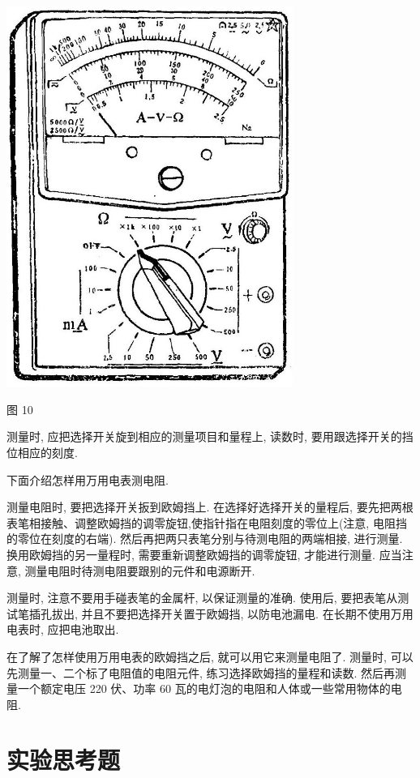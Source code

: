 \documentclass[10pt]{article}
\begin{document}
\begin{center}
\includegraphics[max width=0.7\textwidth]{images/01913056-1f15-74d8-9184-9aab52c9d66b_381_422104.jpg}
\end{center}

图 10

测量时, 应把选择开关旋到相应的测量项目和量程上, 读数时, 要用跟选择开关的挡位相应的刻度.

下面介绍怎样用万用电表测电阻.

测量电阻时, 要把选择开关扳到欧姆挡上. 在选择好选择开关的量程后, 要先把两根表笔相接触、调整欧姆挡的调零旋钮,使指针指在电阻刻度的零位上(注意, 电阻挡的零位在刻度的右端). 然后再把两只表笔分别与待测电阻的两端相接, 进行测量. 换用欧姆挡的另一量程时, 需要重新调整欧姆挡的调零旋钮, 才能进行测量. 应当注意, 测量电阻时待测电阻要跟别的元件和电源断开.

测量时, 注意不要用手碰表笔的金属杆, 以保证测量的准确. 使用后, 要把表笔从测试笔插孔拔出, 并且不要把选择开关置于欧姆挡, 以防电池漏电. 在长期不使用万用电表时, 应把电池取出.

在了解了怎样使用万用电表的欧姆挡之后, 就可以用它来测量电阻了. 测量时, 可以先测量一、二个标了电阻值的电阻元件, 练习选择欧姆挡的量程和读数. 然后再测量一个额定电压 220 伏、功率 60 瓦的电灯泡的电阻和人体或一些常用物体的电阻.

\section*{实验思考题}
\end{document}
